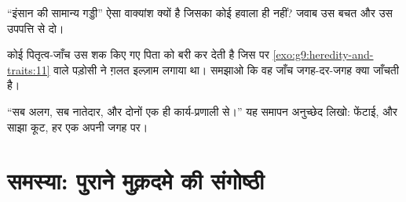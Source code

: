 \begin{exercise}[$\star\star$]\label{exo:g9:unique-individuals:10}
``इंसान की सामान्य गड्डी'' ऐसा वाक्यांश क्यों है जिसका कोई हवाला ही
नहीं? जवाब उस बचत और उस उपपत्ति से दो।
\end{exercise}

\begin{exercise}[$\star\star$]\label{exo:g9:unique-individuals:11}
कोई पितृत्व-जाँच उस शक किए गए पिता को बरी कर देती है जिस पर
\cref{exo:g9:heredity-and-traits:11} वाले पड़ोसी ने ग़लत इल्ज़ाम लगाया
था। समझाओ कि वह जाँच जगह-दर-जगह क्या जाँचती है।
\end{exercise}

\begin{exercise}[$\star\star\star$]\label{exo:g9:unique-individuals:12}
``सब अलग, सब नातेदार, और दोनों एक ही कार्य-प्रणाली से।'' यह समापन
अनुच्छेद लिखो: फेंटाई,  और साझा कूट, हर एक अपनी जगह पर।
\end{exercise}

\section{समस्या: पुराने मुक़दमे की संगोष्ठी}

